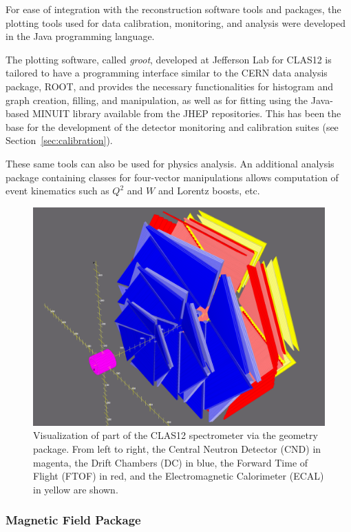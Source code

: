 For ease of integration with the reconstruction software tools and packages, the plotting tools used for data
calibration, monitoring, and analysis were developed in the Java programming language.

The plotting software, called {\it groot}, developed at Jefferson Lab for CLAS12 is tailored to have a programming
interface similar to the CERN data analysis package, ROOT, and provides the necessary functionalities for
histogram and graph creation, filling, and manipulation, as well as for fitting using the Java-based MINUIT library
available from the JHEP repositories. This has been the base for the development of the detector monitoring and
calibration suites (see Section~\ref{sec:calibration}).

These same tools can also be used for physics analysis.
An additional analysis package containing classes for
four-vector manipulations allows computation of event kinematics such as $Q^2$ and $W$ and Lorentz
boosts, etc. 

\begin{figure}
\centering
\includegraphics[width=1.0\columnwidth]{pics/detectorview.png}
\caption{Visualization of part of the CLAS12 spectrometer via the geometry package. From left to right, the Central
  Neutron Detector (CND) in magenta, the Drift Chambers (DC) in blue, the Forward Time of Flight (FTOF) in red,
  and the Electromagnetic Calorimeter (ECAL) in yellow are shown.}
\label{fig:detectorview}
\end{figure}

\subsubsection{Magnetic Field Package}


